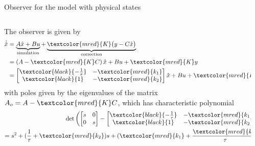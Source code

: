 \documentclass[presentation,aspectratio=169]{beamer}
\begin{document}
\begin{frame}[label={sec:org146a8f1}]{Observer for the model with physical states}
\small

\begin{columns}
\begin{column}{0.4\columnwidth}
The observer is given by
     \begin{equation*}
     \begin{split}
     \dot{\hat{x}} &= \underbrace{A \hat{x} + B u{}}_{\text{simulation}} + \underbrace{\textcolor{mred}{K}\big(y - C\hat{x}\big)}_{\text{correction}}\\
&= \left(A - \textcolor{mred}{K}C\right)\hat{x} +  B u{} + \textcolor{mred}{K}y\\
         &= \begin{bmatrix} \textcolor{black}{-\frac{1}{\tau}} & -\textcolor{mred}{k_1}  \\\textcolor{black}{1} & -\textcolor{mred}{k_2}  \end{bmatrix}\hat{x} +  B u{} + \textcolor{mred}{K}y
     \end{split}
     \end{equation*}
with poles given by the eigenvalues of the matrix \(A_o = A - \textcolor{mred}{K}C\),
which has characteristic polynomial
 \begin{equation*}
     \begin{split}
      \det \left( \begin{bmatrix} s & 0\\ 0 & s\end{bmatrix} - \begin{bmatrix} \textcolor{black}{-\frac{1}{\tau}} & - \textcolor{mred}{k_1}  \\\textcolor{black}{1} & -\textcolor{mred}{k_2}\end{bmatrix}\right)\\
= s^2 + (\frac{1}{\tau} + \textcolor{mred}{k_2})s +  (\textcolor{mred}{k_1}+\frac{\textcolor{mred}{k_2}}{\tau})
     \end{split}
     \end{equation*}
\end{column}




\begin{column}{0.4\columnwidth}
\pause

\begin{center}
\end{center}
\end{column}
\end{columns}
\end{frame}
\end{document}

